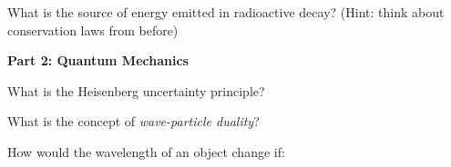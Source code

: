 \documentclass[12pt]{exam}
\begin{document}
\begin{questions}
	
	\question What is the source of energy emitted in radioactive decay? (Hint: think about conservation laws from before)
	\vspace{0.3in}
	
	\clearpage
	\noindent\textbf{\Large Part 2: Quantum Mechanics}
	
	\question What is the Heisenberg uncertainty principle?
		\vspace{0.5in}
		
	\question What is the concept of \textit{wave-particle duality}?
		\vspace{0.5in}
		
	\question How would the wavelength of an object change if:
		

\end{questions}
\end{document}
